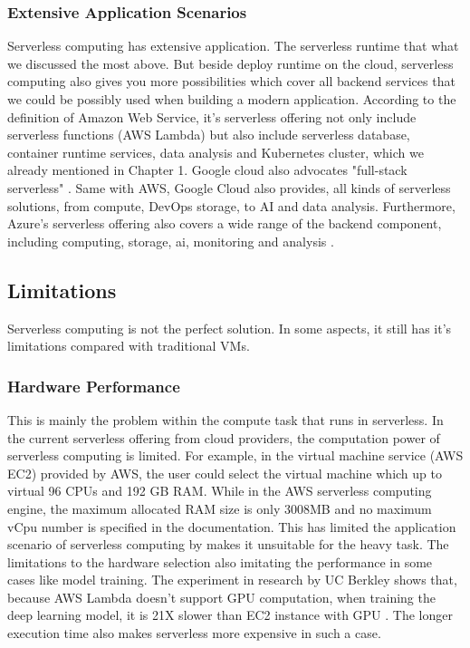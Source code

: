 \subsubsection{Extensive Application Scenarios}
Serverless computing has extensive application. The serverless runtime that what we discussed the most above. But beside deploy runtime on the cloud, serverless computing also gives you more possibilities which cover all backend services that we could be possibly used when building a modern application. According to the definition of Amazon Web Service, it's serverless offering not only include serverless functions (AWS Lambda) but also include serverless database, container runtime services, data analysis and Kubernetes cluster, which we already mentioned in Chapter 1. Google cloud also advocates "full-stack serverless" \cite{Serverle29:online}. Same with AWS, Google Cloud also provides, all kinds of serverless solutions, from compute, DevOps storage, to AI and data analysis. Furthermore, Azure's serverless offering also covers a wide range of the backend component, including computing, storage, ai, monitoring and analysis \cite{AzureSer56:online}.
\subsection{Limitations}
\label{servlesslimitation}
Serverless computing is not the perfect solution. In some aspects, it still has it's limitations compared with traditional VMs.
\subsubsection{Hardware Performance}
This is mainly the problem within the compute task that runs in serverless. In the current serverless offering from cloud providers, the computation power of serverless computing is limited. For example, in the virtual machine service (AWS EC2) provided by AWS, the user could select the virtual machine which up to virtual 96 CPUs and 192 GB RAM. While in the AWS serverless computing engine, the maximum allocated RAM size is only 3008MB \cite{AWSLambd13:online} and no maximum vCpu number is specified in the documentation. This has limited the application scenario of serverless computing by makes it unsuitable for the heavy task. The limitations to the hardware selection also imitating the performance in some cases like model training. The experiment in research by UC Berkley shows that, because AWS Lambda doesn't support GPU computation, when training the deep learning model, it is 21X slower than EC2 instance with GPU \cite{hellerstein2018serverless}. The longer execution time also makes serverless more expensive in such a case. 
